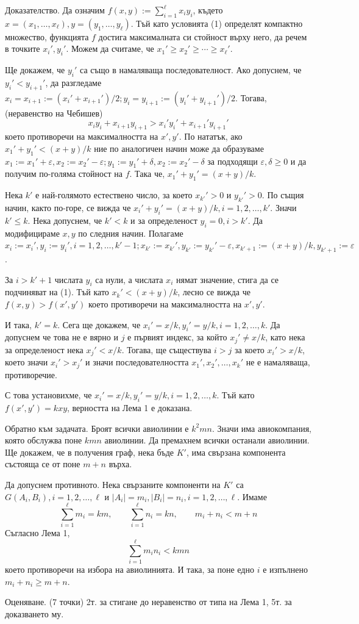 Доказателство. Да означим $f(x,y):=\sum_{i=1}^{\ell}x_iy_i$, където $x=(x_1,\ldots,x_\ell),y=(y_1,\ldots,y_\ell)$. Тъй като условията (1) определят компактно множество, функцията $f$ достига максималната си стойност върху него, да речем в точките $x_i',y_i'$. Можем да считаме, че $x_1'\geq x_2'\geq\cdots\geq x_\ell'$.

Ще докажем, че $y_i'$ са също в намаляваща последователност. Ако допуснем, че $y_i'<y_{i+1}'$, да разгледаме $x_i=x_{i+1}:=(x_i'+x_{i+1}')/2;y_i=y_{i+1}:=(y_i'+y_{i+1}')/2$. Тогава, (неравенство на Чебишев)
$$
x_iy_i+x_{i+1}y_{i+1}>x_i'y_i'+x_{i+1}'y_{i+1}'
$$
което противоречи на максималността на $x',y'$. По нататък, ако $x_1'+y_1'<(x+y)/k$ ние по аналогичен начин може да образуваме $x_1:=x_1'+\varepsilon,x_2:=x_2'-\varepsilon;y_1:=y_1'+\delta,x_2:=x_2'-\delta$ за подходящи $\varepsilon,\delta\geq0$ и да получим по-голяма стойност на $f$. Така че, $x_1'+y_1'=(x+y)/k$.

Нека $k'$ е най-голямото естествено число, за което $x_{k'}'>0$ и $y_{k'}'>0$. По същия начин, както по-горе, се вижда че $x_i'+y_i'=(x+y)/k,i=1,2,\ldots,k'$. Значи $k'\leq k$. Нека допуснем, че $k'<k$ и за определеност $y_i=0,i>k'$. Да модифицираме $x,y$ по следния начин. Полагаме $x_i:=x_i',y_i:=y_i',i=1,2,\ldots,k'-1;x_{k'}:=x_{k'}',y_{k'}:=y_{k'}'-\varepsilon,x_{k'+1}:=(x+y)/k,y_{k'+1}:=\varepsilon$.

За $i>k'+1$ числата $y_i$ са нули, а числата $x_i$ нямат значение, стига да се подчиняват на (1). Тъй като $x_k'<(x+y)/k$, лесно се вижда че $f(x,y)>f(x',y')$ което противоречи на максималността на $x',y'$.

И така, $k'=k$. Сега ще докажем, че $x_i'=x/k,y_i'=y/k,i=1,2,\ldots,k$. Да допуснем че това не е вярно и $j$ е първият индекс, за който $x_j'\ne x/k$, като нека за определеност нека $x_j'<x/k$. Тогава, ще съществува $i>j$ за което $x_i'>x/k$, което значи $x_i'>x_j'$ и значи последователността $x_1',x_2',\ldots,x_k'$ не е намаляваща, противоречие.

С това установихме, че $x_i'=x/k,y_i'=y/k,i=1,2,\ldots,k$. Тъй като $f(x',y')=kxy$, верността на Лема 1 е доказана.

Обратно към задачата. Броят всички авиолинии е $k^2mn$. Значи има авиокомпания, която обслужва поне $kmn$ авиолинии. Да премахнем всички останали авиолинии. Ще докажем, че в получения граф, нека бъде $K'$, има свързана компонента състояща се от поне $m+n$ върха.

Да допуснем противното. Нека свързаните компоненти на $K'$ са $G(A_i,B_i),i=1,2,\ldots,\ell$ и $|A_i|=m_i,|B_i|=n_i,i=1,2,\ldots,\ell$. Имаме
$$
\sum_{i=1}^{\ell}m_i=km,\qquad \sum_{i=1}^{\ell}n_i=kn,\qquad m_i+n_i<m+n
$$
Съгласно Лема 1,
$$
\sum_{i=1}^{\ell}m_in_i<kmn
$$
което противоречи на избора на авиолинията. И така, за поне едно $i$ е изпълнено $m_i+n_i\geq m+n$.

Оценяване. (7 точки) 2т. за стигане до неравенство от типа на Лема 1, 5т. за доказването му.
